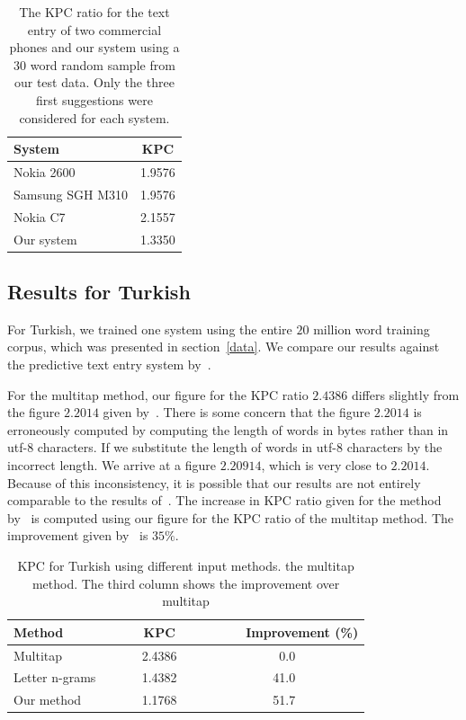 \documentclass{llncs}
\begin{document}
\begin{table}
\caption{The KPC ratio for the text entry of two commercial phones and
  our system using a $30$ word random sample from our test data. Only
  the three first suggestions were considered for each system.}\label{mobile-phone-kpc}
\begin{center}
\begin{tabular}{lc}
\hline
System & KPC\\
\hline
Nokia 2600       & 1.9576\\
Samsung SGH M310 & 1.9576\\
Nokia C7         & 2.1557\\
Our system       & 1.3350\\
\hline
\end{tabular}
\end{center}
\end{table}

\subsection{Results for Turkish}

For Turkish, we trained one system using the entire $20$ million word
training corpus, which was presented in section~\ref{data}. We compare
our results against the predictive text entry system
by~\cite{Tantug:2010}.

For the multitap method, our figure for the KPC ratio $2.4386$ differs
slightly from the figure $2.2014$ given by~\cite{Tantug:2010}. There
is some concern that the figure $2.2014$ is erroneously computed by
computing the length of words in bytes rather than in utf-8
characters. If we substitute the length of words in utf-8 characters
by the incorrect length. We arrive at a figure $2.20914$, which is
very close to $2.2014$. Because of this inconsistency, it is possible
that our results are not entirely comparable to the results
of~\cite{Tantug:2010}. The increase in KPC ratio given for the method
by~\cite{Tantug:2010} is computed using our figure for the KPC ratio
of the multitap method. The improvement given by~\cite{Tantug:2010} is
$35\%$.

\begin{table}
\caption{KPC for Turkish using different input methods. the multitap
  method. The third column shows the improvement over
  multitap}\label{Turkish-kpc-table}
\begin{center}
\begin{tabular}{lcr}
\hline
Method~~~~& ~~~~KPC~~~~ & ~~~~Improvement (\%)\\
\hline
Multitap                          &  2.4386 &0.0~~~~~~~~~~\\
Letter n-grams~\cite{Tantug:2010} &  1.4382 &41.0~~~~~~~~~~\\
Our method                        &  1.1768 &51.7~~~~~~~~~~\\
\hline
\end{tabular}
\end{center}
\end{table}
\end{document}
